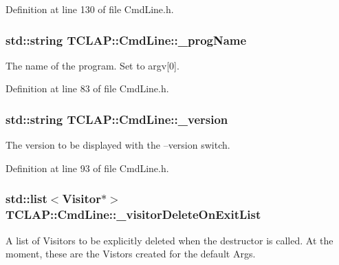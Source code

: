 Definition at line 130 of file Cmd\+Line.\+h.

\hypertarget{class_t_c_l_a_p_1_1_cmd_line_a8b856dadc54fa30d0dddba4588ef9344}{}
\subsubsection[{\+\_\+prog\+Name}]{\setlength{\rightskip}{0pt plus 5cm}std\+::string T\+C\+L\+A\+P\+::\+Cmd\+Line\+::\+\_\+prog\+Name\hspace{0.3cm}{\ttfamily [protected]}}\label{class_t_c_l_a_p_1_1_cmd_line_a8b856dadc54fa30d0dddba4588ef9344}
The name of the program. Set to argv\mbox{[}0\mbox{]}. 

Definition at line 83 of file Cmd\+Line.\+h.

\hypertarget{class_t_c_l_a_p_1_1_cmd_line_a2b2b52fffed2dcb7df3cdfc582ec8fd1}{}
\subsubsection[{\+\_\+version}]{\setlength{\rightskip}{0pt plus 5cm}std\+::string T\+C\+L\+A\+P\+::\+Cmd\+Line\+::\+\_\+version\hspace{0.3cm}{\ttfamily [protected]}}\label{class_t_c_l_a_p_1_1_cmd_line_a2b2b52fffed2dcb7df3cdfc582ec8fd1}
The version to be displayed with the --version switch. 

Definition at line 93 of file Cmd\+Line.\+h.

\hypertarget{class_t_c_l_a_p_1_1_cmd_line_a79b8a947f8100de977574b45b91117ac}{}
\subsubsection[{\+\_\+visitor\+Delete\+On\+Exit\+List}]{\setlength{\rightskip}{0pt plus 5cm}std\+::list$<${\bf Visitor}$\ast$$>$ T\+C\+L\+A\+P\+::\+Cmd\+Line\+::\+\_\+visitor\+Delete\+On\+Exit\+List\hspace{0.3cm}{\ttfamily [protected]}}\label{class_t_c_l_a_p_1_1_cmd_line_a79b8a947f8100de977574b45b91117ac}
A list of Visitors to be explicitly deleted when the destructor is called. At the moment, these are the Vistors created for the default Args. 

